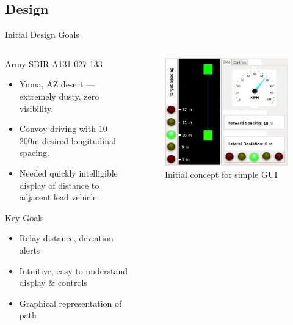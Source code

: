 \documentclass{beamer}
\begin{document}
  \subsection{Design}

    \begin{frame}{Initial Design Goals}
      \begin{columns}
        \begin{column}{0.5\linewidth}
          Army SBIR A131-027-133
          \begin{itemize} \footnotesize
            \item Yuma, AZ desert --- extremely dusty, zero visibility.
            \item Convoy driving with 10-200m desired longitudinal spacing.
            \item Needed quickly intelligible display of distance to adjacent lead vehicle.
          \end{itemize}
          Key Goals
          \begin{itemize} \footnotesize
            \item Relay distance, deviation alerts
            \item Intuitive, easy to understand display \& controls
            \item Graphical representation of path
          \end{itemize}
        \end{column}
        \begin{column}{0.5\linewidth}
          \begin{figure}
            \includegraphics[width=\textwidth]{../graphics/initial_concept.png}
            \caption{\footnotesize Initial concept for simple GUI}
          \end{figure}
        \end{column}
      \end{columns}
    \end{frame}
\end{document}
